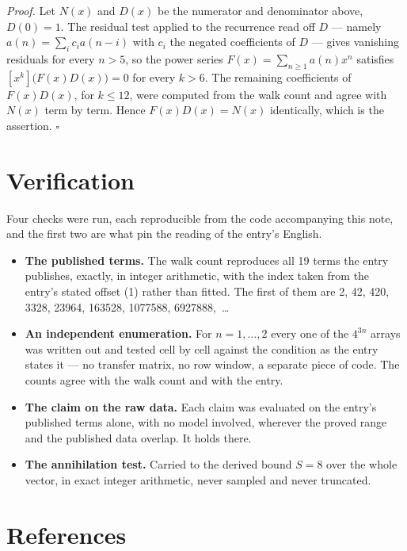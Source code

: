 \documentclass[11pt]{article}
\theoremstyle{definition}
\begin{document}
{\itshape Proof.} Let $N(x)$ and $D(x)$ be the numerator and denominator above, $D(0)=1$. The residual test applied to the recurrence read off $D$ --- namely $a(n) = \sum_i c_i a(n-i)$ with $c_i$ the negated coefficients of $D$ --- gives vanishing residuals for every $n > 5$, so the power series $F(x)=\sum_{n\ge 1}a(n)x^n$ satisfies $[x^k]\bigl(F(x)D(x)\bigr) = 0$ for every $k > 6$. The remaining coefficients of $F(x)D(x)$, for $k \le 12$, were computed from the walk count and agree with $N(x)$ term by term. Hence $F(x)D(x) = N(x)$ identically, which is the assertion. $\square$

\section{Verification}

Four checks were run, each reproducible from the code accompanying this note, and the first two are what pin the reading of the entry's English.

\begin{itemize}

\item {\bfseries The published terms.} The walk count reproduces all 19 terms the entry publishes, exactly, in integer arithmetic, with the index taken from the entry's stated offset (1) rather than fitted. The first of them are 2, 42, 420, 3328, 23964, 163528, 1077588, 6927888,~\dots

\item {\bfseries An independent enumeration.} For $n = 1,\dots,2$ every one of the $4^{3n}$ arrays was written out and tested cell by cell against the condition as the entry states it --- no transfer matrix, no row window, a separate piece of code. The counts agree with the walk count and with the entry.

\item {\bfseries The claim on the raw data.} Each claim was evaluated on the entry's published terms alone, with no model involved, wherever the proved range and the published data overlap. It holds there.

\item {\bfseries The annihilation test.} Carried to the derived bound $S = 8$ over the whole vector, in exact integer arithmetic, never sampled and never truncated.

\end{itemize}

\section{References}
\end{document}
